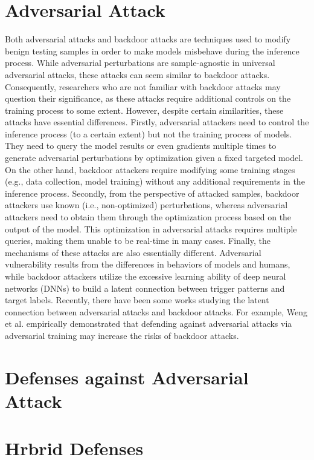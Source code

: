 \documentclass[conference]{IEEEtran}
\begin{document}
\section{Adversarial Attack}
Both adversarial attacks and backdoor attacks are techniques used to modify benign
testing samples in order to make models misbehave during the inference process.
While adversarial perturbations are sample-agnostic in universal adversarial attacks,
these attacks can seem similar to backdoor attacks. Consequently, researchers who are
not familiar with backdoor attacks may question their significance, as these attacks
require additional controls on the training process to some extent.
However, despite certain similarities, these attacks have essential differences.
Firstly, adversarial attackers need to control the inference process (to a certain extent)
but not the training process of models. They need to query the model results or even gradients
multiple times to generate adversarial perturbations by optimization given a fixed targeted model.
On the other hand, backdoor attackers require modifying some training stages (e.g., data collection,
model training) without any additional requirements in the inference process.
Secondly, from the perspective of attacked samples, backdoor attackers use known
(i.e., non-optimized) perturbations, whereas adversarial attackers need to obtain them through
the optimization process based on the output of the model. This optimization in adversarial attacks
requires multiple queries, making them unable to be real-time in many cases.
Finally, the mechanisms of these attacks are also essentially different.
Adversarial vulnerability results from the differences in behaviors of models and humans,
while backdoor attackers utilize the excessive learning ability of deep neural networks (DNNs)
to build a latent connection between trigger patterns and target labels. Recently,
there have been some works studying the latent connection between adversarial attacks
and backdoor attacks. For example, Weng et al. \cite{b66}empirically demonstrated that defending
against adversarial attacks via adversarial training may increase the risks of backdoor attacks.



\section{Defenses against Adversarial Attack}
\section{Hrbrid Defenses}
\end{document}
